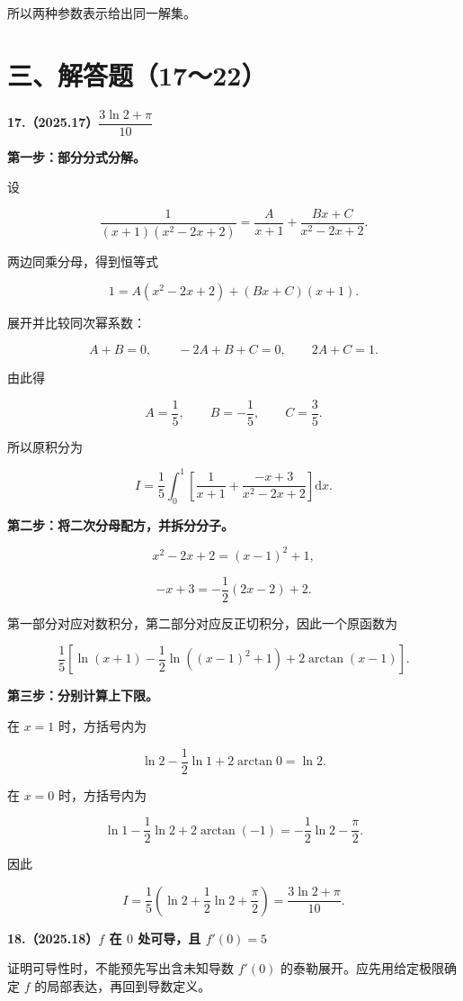 \documentclass[UTF8,11pt,fontset=windows]{ctexart}
\begin{document}
所以两种参数表示给出同一解集。

\clearpage

\section*{三、解答题（17～22）}

\textbf{17.（2025.17）$\dfrac{3\ln2+\pi}{10}$}

\textbf{第一步：部分分式分解。}

设

$$
\frac1{(x+1)(x^2-2x+2)}
=\frac A{x+1}+\frac{Bx+C}{x^2-2x+2}.
$$

两边同乘分母，得到恒等式

$$
1=A(x^2-2x+2)+(Bx+C)(x+1).
$$

展开并比较同次幂系数：

$$
A+B=0,\qquad -2A+B+C=0,\qquad 2A+C=1.
$$

由此得

$$
A=\frac15,\qquad B=-\frac15,\qquad C=\frac35.
$$

所以原积分为

$$
I=\frac15\int_0^1\left[
\frac1{x+1}+\frac{-x+3}{x^2-2x+2}
\right]\mathrm dx.
$$

\textbf{第二步：将二次分母配方，并拆分分子。}

$$
x^2-2x+2=(x-1)^2+1,
$$

$$
-x+3=-\frac12(2x-2)+2.
$$

第一部分对应对数积分，第二部分对应反正切积分，因此一个原函数为

$$
\frac15\left[
\ln(x+1)-\frac12\ln((x-1)^2+1)+2\arctan(x-1)
\right].
$$

\textbf{第三步：分别计算上下限。}

在 $x=1$ 时，方括号内为

$$
\ln2-\frac12\ln1+2\arctan0=\ln2.
$$

在 $x=0$ 时，方括号内为

$$
\ln1-\frac12\ln2+2\arctan(-1)
=-\frac12\ln2-\frac\pi2.
$$

因此

$$
I=\frac15\left(\ln2+\frac12\ln2+\frac\pi2\right)
=\boxed{\frac{3\ln2+\pi}{10}}.
$$

\clearpage

\textbf{18.（2025.18）$f$ 在 $0$ 处可导，且 $f'(0)=5$}

证明可导性时，不能预先写出含未知导数 $f'(0)$ 的泰勒展开。应先用给定极限确定 $f$ 的局部表达，再回到导数定义。
\end{document}
